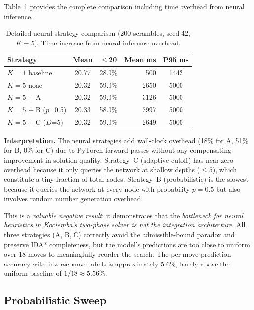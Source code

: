 \documentclass[10pt,twocolumn,a4paper]{article}
\begin{document}
Table~\ref{tab:neural-detail} provides the complete comparison including time overhead from neural inference.

\begin{table}[t]
\centering
\caption{Detailed neural strategy comparison (200 scrambles, seed 42, $K{=}5$). Time increase from neural inference overhead.}
\label{tab:neural-detail}
\begin{tabular}{@{}lccrc@{}}
\toprule
\textbf{Strategy} & \textbf{Mean} & \textbf{$\leq$20} & \textbf{Mean ms} & \textbf{P95 ms} \\
\midrule
$K{=}1$ baseline    & 20.77 & 28.0\% & 500  & 1442 \\
$K{=}5$ none        & 20.32 & 59.0\% & 2650 & 5000 \\
$K{=}5$ + A         & 20.32 & 59.0\% & 3126 & 5000 \\
$K{=}5$ + B ($p$=0.5) & 20.33 & 58.0\% & 3997 & 5000 \\
$K{=}5$ + C ($D$=5) & 20.32 & 59.0\% & 2649 & 5000 \\
\bottomrule
\end{tabular}
\end{table}

\textbf{Interpretation.} The neural strategies add wall-clock overhead (18\% for A, 51\% for B, 0\% for C) due to PyTorch forward passes without any compensating improvement in solution quality. Strategy~C (adaptive cutoff) has near-zero overhead because it only queries the network at shallow depths ($\leq 5$), which constitute a tiny fraction of total nodes. Strategy~B (probabilistic) is the slowest because it queries the network at every node with probability $p=0.5$ but also involves random number generation overhead.

This is a \emph{valuable negative result}: it demonstrates that the \emph{bottleneck for neural heuristics in Kociemba's two-phase solver is not the integration architecture}. All three strategies (A, B, C) correctly avoid the admissible-bound paradox and preserve IDA* completeness, but the model's predictions are too close to uniform over 18 moves to meaningfully reorder the search. The per-move prediction accuracy with inverse-move labels is approximately 5.6\%, barely above the uniform baseline of $1/18 \approx 5.56\%$.

\subsection{Probabilistic Sweep}
\label{sec:probsweep}
\end{document}
